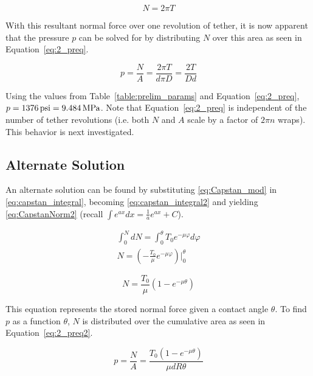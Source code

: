 \begin{equation}
	\label{eq:CapstanNorm}
	N=2\pi T	
\end{equation}

With this resultant normal force over one revolution of tether, it is now apparent that the pressure $p$ can be solved for by distributing $N$ over this area as seen in Equation~\ref{eq:2_preq}.

\begin{equation}
	\label{eq:2_preq}
	p=\frac{N}{A}=\frac{2\pi T}{d\pi D}=\frac{2T}{Dd}
\end{equation}

Using the values from Table~\ref{table:prelim_params} and Equation~\ref{eq:2_preq}, $p=1376\,\mathrm{psi}= 9.484\,\mathrm{MPa}$. Note that Equation~\ref{eq:2_preq} is independent of the number of tether revolutions (i.e. both $N$ and $A$ scale by a factor of $2\pi n$ wraps). This behavior is next investigated.

\subsection{Alternate Solution}
\label{subsection:alt}

An alternate solution can be found by substituting \ref{eq:Capstan_mod} in \ref{eq:capstan_integral}, becoming \ref{eq:capstan_integral2} and yielding \ref{eq:CapstanNorm2} (recall $\int e^{ax} dx = \tfrac{1}{a} e^{ax} + C$).

\begin{equation}
	\label{eq:capstan_integral2}
	\begin{aligned}
		\int_0^N dN =\int_0^{\theta} T_{0} e^{-\mu \varphi} d\varphi            \\
		N = \left( -\frac{T_{0}}{\mu} e^{-\mu \varphi} \right) \Big|_0^{\theta} 
	\end{aligned}
\end{equation}

\begin{equation}
	\label{eq:CapstanNorm2}
	N = \frac{T_{0}}{\mu} \left( 1 - e^{-\mu \theta} \right)
\end{equation}

This equation represents the stored normal force given a contact angle $\theta$. To find $p$ as a function $\theta$, $N$ is distributed over the cumulative area as seen in Equation~\ref{eq:2_preq2}.

\begin{equation}
	\label{eq:2_preq2}
	p=\frac{N}{A}= \frac{T_{0} \left( 1 - e^{-\mu \theta} \right)}{\mu d R \theta}
\end{equation}

